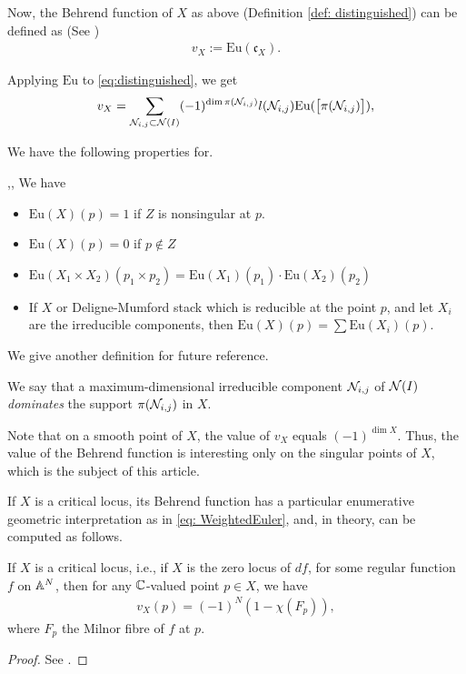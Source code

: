 \documentclass[11pt,a4paper,leqno,noamsfonts]{amsart}
\numberwithin{equation}{section}
\begin{document}
Now, the Behrend function of $X$ as above (Definition \ref{def: distinguished}) can be defined as (See \cite[Definition 1.4]{Beh})
\begin{align}\label{eq:BehEuler}
    v_X:=\mathrm{Eu}(\mathfrak{c}_X).
\end{align}

Applying $\mathrm{Eu}$ to \ref{eq:distinguished}, we get 
 \begin{align}
       v_X=\sum_{{\mathcal N}_{i,j}\subset{\mathcal N}(I)}(-1)^{\dim\pi({\mathcal N}_{i,j})}l({\mathcal N}_{i,j})\mathrm{Eu}(\big[\pi({\mathcal N}_{i,j})\big]),
     \end{align}

     We have the following properties for.
     \begin{lemma}\label{PropertiesEuler}\cite[Definition 2.4]{Jiang},\cite[Section 3]{MacPherson}, \cite{RicolfiSign} We have
     \begin{itemize}
         \item  $\mathrm{Eu}(X)(p) = 1$ if $Z$ is nonsingular at $p$.
         \item $\mathrm{Eu}(X)(p) = 0$ if $p\not\in Z$
         \item$ \mathrm{Eu}(X_1 \times X_2)(p_1 \times p_2) = \mathrm{Eu}(X_1)(p_1) \cdot \mathrm{Eu}(X_2)(p_2)$
\item If  $X$ or Deligne-Mumford stack which is reducible at the point $p$, and
let $X_i$ are the irreducible components, then $\mathrm{Eu}(X)(p) =\sum\mathrm{Eu}(X_i)(p)$.
     \end{itemize}

     
       
     \end{lemma}

We give another definition for future reference.
\begin{definition}\label{def: dominant} We say that a maximum-dimensional irreducible component ${\mathcal N}_{i,j}$ of ${\mathcal N}(I)$ \emph{dominates}  the support $\pi({\mathcal N}_{i,j})$ in $X$.
    
\end{definition}
\begin{remark}
    Note that on a smooth point of $X$, the value of $v_X$ equals $(-1)^{\dim X}$. Thus, the value of the Behrend function is interesting only on the singular points of $X$, which is the subject of this article.
\end{remark}

If $X$ is a critical locus, its Behrend function has a particular enumerative geometric interpretation as in \eqref{eq: WeightedEuler}, and, in theory, can be computed as follows.
\begin{lemma}\cite[Section 1.2]{Beh}\label{lem: CriticalLocus}
If $X$ is a critical locus, i.e., if $X$ is the zero locus of $df$, for some regular function $f$ on ${\mathbb{A}}^N$, then for any ${\mathbb{C}}$-valued point $p\in X$, we have
\begin{align}
    v_X(p)=(-1)^{N}(1-\chi(F_p)),
\end{align}
where $F_p$ the Milnor fibre of $f$ at $p$.
\end{lemma}
\begin{proof}
    See \cite[Corollary 2.4 (iii)]{PP}.
\end{proof}
\end{document}
